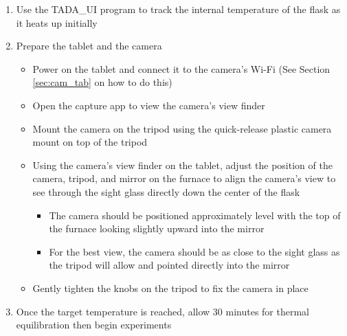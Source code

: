 \documentclass[letterpaper,11pt]{article}
\begin{document}
\begin{enumerate}
    \item Use the TADA\_UI program to track the internal temperature of the 
        flask as it heats up initially
    \item Prepare the tablet and the camera
        \begin{itemize}
        \item Power on the tablet and connect it to the camera's Wi-Fi (See 
            Section \ref{sec:cam_tab} on how to do this)
        \item Open the capture app to view the camera's view finder
        \item Mount the camera on the tripod using the quick-release
            plastic camera mount on top of the tripod
        \item Using the camera's view finder on the tablet, adjust the
            position of the camera, tripod, and mirror on the furnace to 
            align the camera's view to see through the sight glass directly down the center of the flask
            \begin{itemize}
            \item The camera should be positioned approximately level with the 
                 top of the furnace looking slightly upward into the mirror
            \item For the best view, the camera should be as close to the 
                sight glass as the tripod will allow and pointed directly into 
                the mirror
            \end{itemize}
        
        \item Gently tighten the knobs on the tripod to fix the camera in place
        \end{itemize}
    
    \item Once the target temperature is reached, allow 30 minutes for thermal 
        equilibration then begin experiments
    \end{enumerate}
    
\end{document}
